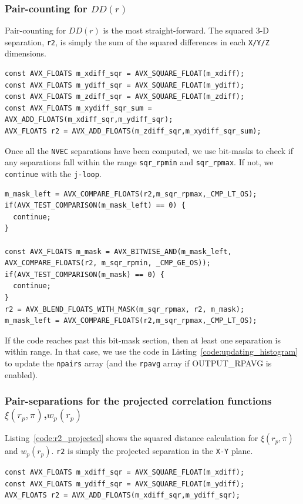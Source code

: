 \documentclass[12pt,titlepage]{article}
\newcommand{\xir}{\ensuremath{{DD(r)}}\xspace}
\newcommand{\wprp}{\ensuremath{{w_p(r_p)}}\xspace}
\newcommand{\xirppi}{\ensuremath{{\xi(r_p,\pi)}}\xspace}
\begin{document}
\subsubsection{Pair-counting for \texorpdfstring{\xir}{xi(r)}}\label{section:pair_counting_r}
Pair-counting for \xir is the most straight-forward. The squared 3-D separation, \texttt{r2}, is simply the sum of the squared differences in 
each \texttt{X/Y/Z} dimensions. 
\begin{lstlisting}[label={code:r2_xi},caption={Calculating squared separations in \xir.}]
const AVX_FLOATS m_xdiff_sqr = AVX_SQUARE_FLOAT(m_xdiff);
const AVX_FLOATS m_ydiff_sqr = AVX_SQUARE_FLOAT(m_ydiff);
const AVX_FLOATS m_zdiff_sqr = AVX_SQUARE_FLOAT(m_zdiff);
const AVX_FLOATS m_xydiff_sqr_sum = AVX_ADD_FLOATS(m_xdiff_sqr,m_ydiff_sqr);
AVX_FLOATS r2 = AVX_ADD_FLOATS(m_zdiff_sqr,m_xydiff_sqr_sum);
\end{lstlisting}
Once all the \texttt{NVEC} separations have been computed, we use bit-masks to check if any separations fall 
within the range \texttt{sqr\_rpmin} and \texttt{sqr\_rpmax}. If not, we \texttt{continue} with the \texttt{j-loop}. 
\begin{lstlisting}[label={code:masks_xi},caption={Bit-masks in \xir.}]
m_mask_left = AVX_COMPARE_FLOATS(r2,m_sqr_rpmax,_CMP_LT_OS);
if(AVX_TEST_COMPARISON(m_mask_left) == 0) {
  continue;
}

const AVX_FLOATS m_mask = AVX_BITWISE_AND(m_mask_left, AVX_COMPARE_FLOATS(r2, m_sqr_rpmin, _CMP_GE_OS));
if(AVX_TEST_COMPARISON(m_mask) == 0) {
  continue;
}
r2 = AVX_BLEND_FLOATS_WITH_MASK(m_sqr_rpmax, r2, m_mask);
m_mask_left = AVX_COMPARE_FLOATS(r2,m_sqr_rpmax,_CMP_LT_OS);
\end{lstlisting}
If the code reaches past this bit-mask section, then at least one separation is within range. In that case, we use the 
code in Listing~\ref{code:updating_histogram} to update the \texttt{npairs} array (and the \texttt{rpavg} array if 
OUTPUT\_RPAVG is enabled). 

\subsubsection{Pair-separations for the projected correlation functions \texorpdfstring{\xirppi,\wprp}{xi(rp,pi), wp(rp)}}
Listing~\ref{code:r2_projected} shows the squared distance calculation for \xirppi and \wprp. \texttt{r2} is simply 
the projected separation in the \texttt{X-Y} plane.
\begin{lstlisting}[label={code:r2_projected},caption={Calculating squared separations in \xirppi and \wprp.}]
const AVX_FLOATS m_xdiff_sqr = AVX_SQUARE_FLOAT(m_xdiff);
const AVX_FLOATS m_ydiff_sqr = AVX_SQUARE_FLOAT(m_ydiff);
AVX_FLOATS r2 = AVX_ADD_FLOATS(m_xdiff_sqr,m_ydiff_sqr);
\end{lstlisting}
\end{document}
